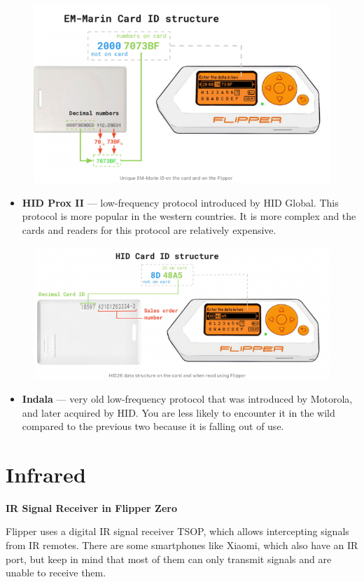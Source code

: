 \documentclass[a4paper,11pt]{report}
\begin{document}
  \begin{figure}[h]
    \centering
    \hspace{21pt}
    \includegraphics[width=.70\linewidth]{EM_marin.png}
    \label{fig:type.png}
  \end{figure}
  \begin{itemize}
    \item \textbf{HID Prox II} — low-frequency protocol introduced by HID Global. This protocol is more popular in the western countries. It is more complex and the cards and readers for this protocol are relatively expensive. 
  \end{itemize}
  \begin{figure}[h]
    \centering
    \hspace{21pt}
    \includegraphics[width=.70\linewidth]{hid.png}
    \label{fig:type.png}
  \end{figure}
  \begin{itemize}
    \item \textbf{Indala} — very old low-frequency protocol that was introduced by Motorola, and later acquired by HID. You are less likely to encounter it in the wild compared to the previous two because it is falling out of use.
  \end{itemize}
\section{Infrared}
\textbf{IR Signal Receiver in Flipper Zero} 

Flipper uses a digital IR signal receiver TSOP, which allows intercepting signals from IR remotes. There are some smartphones like Xiaomi, which also have an IR port, but keep in mind that most of them can only transmit signals and are unable to receive them.
\end{document}
